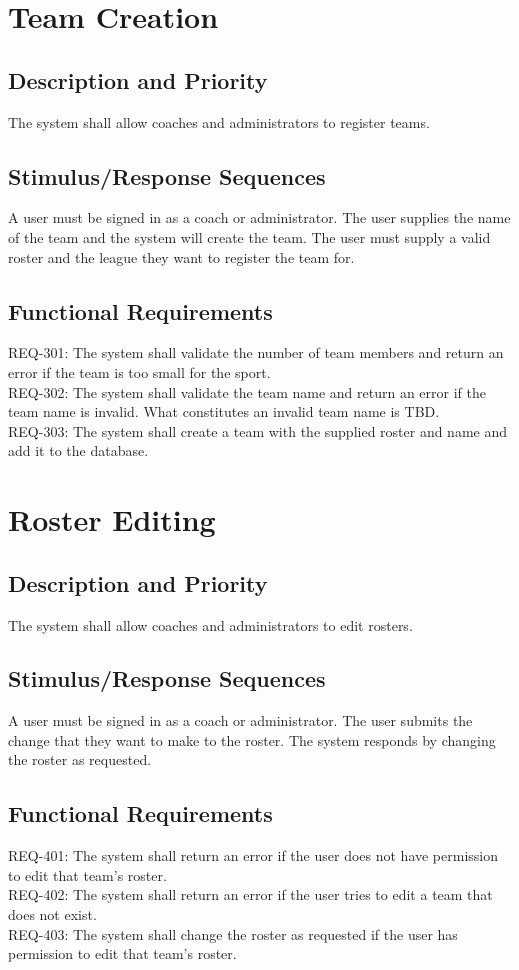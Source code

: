 \documentclass{scrreprt}
\begin{document}
\section{Team Creation}
    
    \subsection{Description and Priority}   
    The system shall allow coaches and administrators to register teams.
    \subsection{Stimulus/Response Sequences}    
    A user must be signed in as a coach or administrator. The user supplies the name of the team and the system will create the team. The user must supply a valid roster and the league they want to register the team for.
    \subsection{Functional Requirements}
    REQ-301: The system shall validate the number of team members and return an error if the team is too small for the sport. \\
    REQ-302: The system shall validate the team name and return an error if the team name is invalid. What constitutes an invalid team name is TBD. \\
    REQ-303: The system shall create a team with the supplied roster and name and add it to the database.

\section{Roster Editing}
  
    \subsection{Description and Priority}   
    The system shall allow coaches and administrators to edit rosters.
        \subsection{Stimulus/Response Sequences}    
    A user must be signed in as a coach or administrator. The user submits the change that they want to make to the roster. The system responds by changing the roster as requested.
        \subsection{Functional Requirements}
    REQ-401: The system shall return an error if the user does not have permission to edit that team's roster. \\
    REQ-402: The system shall return an error if the user tries to edit a team that does not exist. \\
    REQ-403: The system shall change the roster as requested if the user has permission to edit that team's roster.
\end{document}
